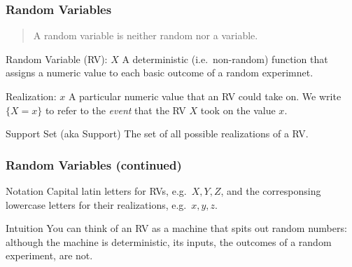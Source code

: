 \documentclass[handout]{beamer}
\date{Lecture \# 8}
\begin{document}
 


\begin{frame}[plain]
	\titlepage 
	

\end{frame} 


\def\RVraw{(-2.5,0) circle [radius=1.7]
	(-2.5,0) circle [radius=1.7]
	(2.5,0) circle [radius=1.7]
	node [above left] at (-3.75,1.25) {$S$}
	node [above right] at (3.75,1.25) {$\mathbb{R}$}
	node [above] at (0,2) {$X\colon S \mapsto \mathbb{R}$}}
\begin{frame}
  \frametitle{Random Variables}
  \begin{quote}
    A random variable is neither random nor a variable.
  \end{quote}
\begin{block}{Random Variable (RV): $X$}
  A deterministic (i.e.\ non-random) function that assigns a numeric value to each basic outcome of a random experimnet.
\end{block}
 
\begin{block}{Realization: $x$}
A particular numeric value that an RV could take on. We write $\{X = x\}$ to refer to the \emph{event} that the RV $X$ took on the value $x$.  
\end{block}
 
\begin{block}{Support Set (aka Support)}
The set of all possible realizations of a RV.
\end{block}
 
\end{frame}
\begin{frame}
  \frametitle{Random Variables (continued)}
\begin{block}{Notation}
Capital latin letters for RVs, e.g.\ $X,Y,Z$, and the corresponsing lowercase letters for their realizations, e.g.\ $x,y,z$.
\end{block}

\begin{block}{Intuition}
  You can think of an RV as a machine that spits out random numbers: although the machine is deterministic, its inputs, the outcomes of a random experiment, are not.
\end{block}
\end{frame}
\end{document}
